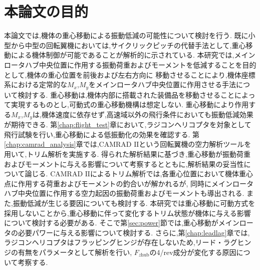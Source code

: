     \section{本論文の目的}
    \label{sec:thesis_perpose}
    \par
    本論文では,機体の重心移動による振動低減の可能性について検討を行う.
    既に小型から中型の回転翼機においては,サイクリックピッチの代替手法として,重心移動による機体制御が可能であることが解析的に示されている.
    本研究では,メインロータハブ中央位置に作用する振動荷重およびモーメントを低減することを目的として,機体の重心位置を前後および左右方向に
    移動させることにより,機体座標系における定常的な$M_x$,$M_y$をメインロータハブ中央位置に作用させる手法について検討する.
    重心移動は,機体内部に搭載された装備品を移動させることによって実現するものとし,可動式の重心移動機構は想定しない.
    重心移動により作用する$M_x$,$M_y$は,機体速度に依存せず,高速域以外の飛行条件においても振動低減効果が期待できる.
    第\ref{chap:flight_test}章において,ラジコンヘリコプタを対象として飛行試験を行い,重心移動による低振動化の効果を確認する.
    第\ref{chap:camrad_analysis}章では,CAMRAD $\mathrm{II}$という回転翼機の空力解析ツールを用いて,トリム解析を実施する.
    得られた解析結果に基づき,重心移動が振動荷重およびモーメントに与える影響について考察するとともに,解析結果の妥当性について論じる.
    CAMRAD $\mathrm{II}$によるトリム解析では,各重心位置において機体重心点に作用する荷重およびモーメントの釣合いが解かれるが,
    同時にメインロータハブ中央位置に作用する空力起因の振動荷重およびモーメントも導出される.
    また,振動低減が生じる要因についても検討する.
    本研究では重心移動に可動方式を採用しないことから,重心移動に伴って変化するトリム状態が機体に与える影響について検討する必要がある.
    そこで第\ref{sec:power}節では,重心移動がメインロータの必要パワーに与える影響について検討する.
    さらに,第\ref{chap:leadlag}章では,ラジコンヘリコプタはフラッピングヒンジが存在しないため,リード・ラグヒンジの有無をパラメータとして解析を行い,
    $F_{z\mathrm{hub}}$の4/rev成分が変化する原因について考察する.

    \clearpage
